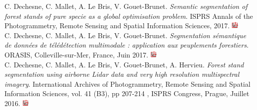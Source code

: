 C. Dechesne, C. Mallet, A. Le Bris, V. Gouet-Brunet. \textit{Semantic segmentation of forest stands of pure specie as a global optimisation problem}. ISPRS Annals of the Photogrammetry, Remote Sensing and Spatial Information Sciences, 2017. \href{http://recherche.ign.fr/labos/matis/pdf/articles_conf/2017/workshop_hanover_2017_dechesne.pdf}{\includegraphics[height=10pt]{Appendices/ic_pdf.jpg}} \\

C. Dechesne, C. Mallet, A. Le Bris, V. Gouet-Brunet. \textit{Segmentation sémantique de données de télédétection multimodale : application aux peuplements forestiers}. ORASIS, Colleville-sur-Mer, France, Juin 2017. \href{http://recherche.ign.fr/labos/matis/pdf/articles_conf/2017/orasis2017_Dechesne.pdf}{\includegraphics[height=10pt]{Appendices/ic_pdf.jpg}} \\

C. Dechesne, C. Mallet, A. Le Bris, V. Gouet-Brunet, A. Hervieu. \textit{Forest stand segmentation using airborne Lidar data and very high resolution multispectral imagery}. International Archives of Photogrammetry, Remote Sensing and Spatial Information Sciences, vol. 41 (B3), pp 207-214 , ISPRS Congress, Prague, Juillet 2016. \href{http://recherche.ign.fr/labos/matis/pdf/articles_conf/2016/dechesne_isprs_2016.pdf}{\includegraphics[height=10pt]{Appendices/ic_pdf.jpg}} \\

\stopcontents[chapters]